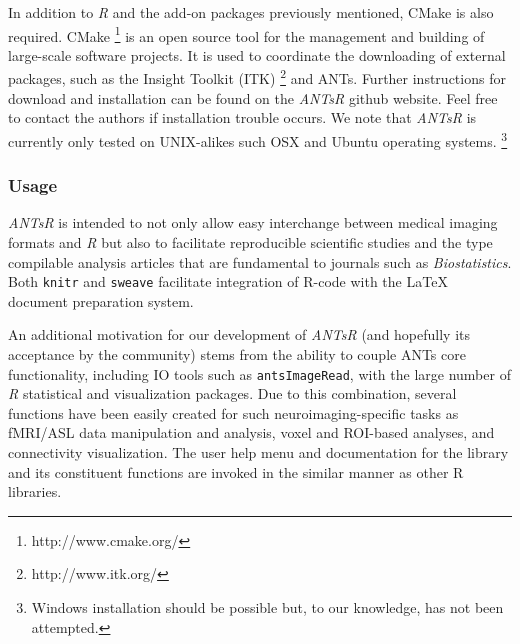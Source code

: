 \documentclass[preprint,authoryear,review,12pt]{elsarticle}
\begin{document}
In addition to \textit{R} and the add-on packages previously mentioned, CMake is also 
required.  CMake%
\footnote{
http://www.cmake.org/
}
is an open source tool for the management and building of 
large-scale software projects.  It is used
to coordinate the downloading of external packages,
such as the Insight Toolkit (ITK)%
\footnote{
http://www.itk.org/
}
and ANTs.  Further instructions for download and
installation can be found on the \textit{ANTsR} github website.  Feel
free to contact the authors if installation trouble occurs.  We note
that \textit{ANTsR} is currently only tested on UNIX-alikes such OSX and Ubuntu
operating systems.%
\footnote{Windows installation should be possible
but, to our knowledge, has not been attempted.}

\subsubsection{Usage}
\textit{ANTsR} is intended to not only allow easy interchange between
medical imaging formats and \textit{R} but also to facilitate
reproducible scientific studies and the type compilable analysis
articles that are fundamental to journals such as
\textit{Biostatistics}.  Both \verb#knitr# and \verb#sweave#
facilitate integration of R-code with the LaTeX document
preparation system.  

An additional motivation for our development of \textit{ANTsR} (and
hopefully its acceptance by the community) 
stems from the ability to couple ANTs core 
functionality, including IO tools such as \verb#antsImageRead#, 
with the large number of \textit{R} statistical and
visualization packages.  Due to this combination, several
functions have been easily created for such neuroimaging-specific 
tasks as fMRI/ASL data manipulation and analysis,
voxel and ROI-based  analyses,
and connectivity visualization. %
The user help menu and documentation for the library  and its
constituent functions are invoked in the similar manner as other
R libraries.
\end{document}
